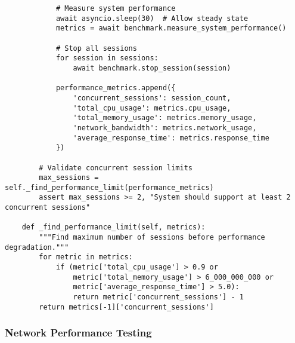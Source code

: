 \documentclass[12pt,a4paper]{article}
\begin{document}
\begin{verbatim}
            # Measure system performance
            await asyncio.sleep(30)  # Allow steady state
            metrics = await benchmark.measure_system_performance()
            
            # Stop all sessions
            for session in sessions:
                await benchmark.stop_session(session)
            
            performance_metrics.append({
                'concurrent_sessions': session_count,
                'total_cpu_usage': metrics.cpu_usage,
                'total_memory_usage': metrics.memory_usage,
                'network_bandwidth': metrics.network_usage,
                'average_response_time': metrics.response_time
            })
        
        # Validate concurrent session limits
        max_sessions = self._find_performance_limit(performance_metrics)
        assert max_sessions >= 2, "System should support at least 2 concurrent sessions"
    
    def _find_performance_limit(self, metrics):
        """Find maximum number of sessions before performance degradation."""
        for metric in metrics:
            if (metric['total_cpu_usage'] > 0.9 or 
                metric['total_memory_usage'] > 6_000_000_000 or
                metric['average_response_time'] > 5.0):
                return metric['concurrent_sessions'] - 1
        return metrics[-1]['concurrent_sessions']
\end{verbatim}

\subsubsection{Network Performance Testing}
\end{document}
